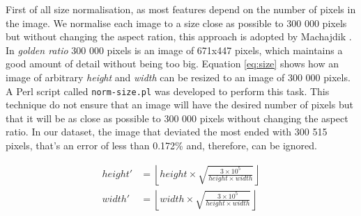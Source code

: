 \documentclass[11pt,a4paper,twoside,openright]{report}
\begin{document}
First of all size normalisation, as most features depend on the number of
pixels in the image.  We normalise each image to a size close as possible to
300 000 pixels but without changing the aspect ration, this approach is adopted
by Machajdik \cite{mach10clas}.  In \emph{golden ratio} 300 000 pixels is an
image of 671x447 pixels, which maintains a good amount of detail without being
too big.  Equation \ref{eq:size} shows how an image of arbitrary \emph{height}
and \emph{width} can be resized to an image of 300 000 pixels.  A Perl script
called \texttt{norm-size.pl} was developed to perform this task.  This
technique do not ensure that an image will have the desired number of pixels
but that it will be as close as possible to 300 000 pixels without changing the
aspect ratio.  In our dataset, the image that deviated the most ended with 300
515 pixels, that's an error of less than 0.172\% and, therefore, can be
ignored.

%
%

\begin{equation}
\begin{aligned}
height'  &= \left\lfloor
            height \times \sqrt{ \frac{3 \times 10^5}
                                      {height \times width} } \right\rfloor \\
width'   &= \left\lfloor
            width  \times \sqrt{ \frac{3 \times 10^5}
                                      {height \times width} } \right\rfloor \\
\label{eq:size}
\end{aligned}
\end{equation}
\end{document}
